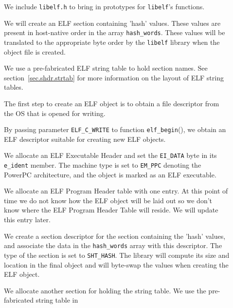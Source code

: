 \documentclass[a4paper]{book}
\makeatletter
\newcommand{\constant}[1]{\texttt{#1}}
\newcommand{\function}[1]{\texttt{#1}()}
\newcommand{\filename}[1]{\texttt{#1}}
\newcommand{\library}[1]{\texttt{#1}}
\newcommand{\parameter}[1]{\texttt{#1}}
\newenvironment{callout}[2][blue]{%
  \begingroup\newcommand{\@cocolor}{#1}%
  \newcommand{\@cogroup}[1]{#2}}{\endgroup}
\newcommand{\@co}[1]{\framebox{\textbf{\color{\@cocolor}#1}}}
\newcommand{\coref}[1]{%
  \hypertarget{\@cogroup.#1.cr}{%
    \hyperlink{\@cogroup.#1.co}{\@co{#1}}}}
\makeatother
\begin{document}
\begin{callout}{prog5}
  

  \begin{description}
  \item[\coref{1}] We include \filename{libelf.h} to bring in
    prototypes for \library{libelf}'s functions.
    \item[\coref{2}] We will create an ELF section containing 'hash'
      values.  These values are present in host-native order in the
      array \parameter{hash\_words}.  These values will be translated
      to the appropriate byte order by the \library{libelf} library
      when the object file is created.
    \item[\coref{3}] We use a pre-fabricated ELF string table to hold
      section names.  See section~\vref{sec.shdr.strtab} for more
      information on the layout of ELF string tables.
    \item[\coref{4}] The first step to create an ELF object is to
      obtain a file descriptor from the OS that is opened for writing.
    \item[\coref{5}] By passing parameter \constant{ELF\_C\_WRITE} to
      function \function{elf\_begin}, we obtain an ELF descriptor
      suitable for creating new ELF objects.
    \item[\coref{6}] We allocate an ELF Executable Header and set the
      \constant{EI\_DATA} byte in its \parameter{e\_ident} member.
      The machine type is set to \constant{EM\_PPC} denoting the
      PowerPC architecture, and the object is marked as an ELF
      executable.
    \item[\coref{7}] We allocate an ELF Program Header table with one
      entry.  At this point of time we do not know how the ELF object
      will be laid out so we don't know where the ELF Program Header
      Table will reside.  We will update this entry later.
    \item[\coref{8}] We create a section descriptor for the section
      containing the 'hash' values, and associate the data in the
      \parameter{hash\_words} array with this descriptor.  The type of
      the section is set to \constant{SHT\_HASH}.  The library will
      compute its size and location in the final object and will
      byte-swap the values when creating the ELF object.
    \item[\coref{9}] We allocate another section for holding the
      string table.  We use the pre-fabricated string table in

\end{description}
\end{callout}
\end{document}

